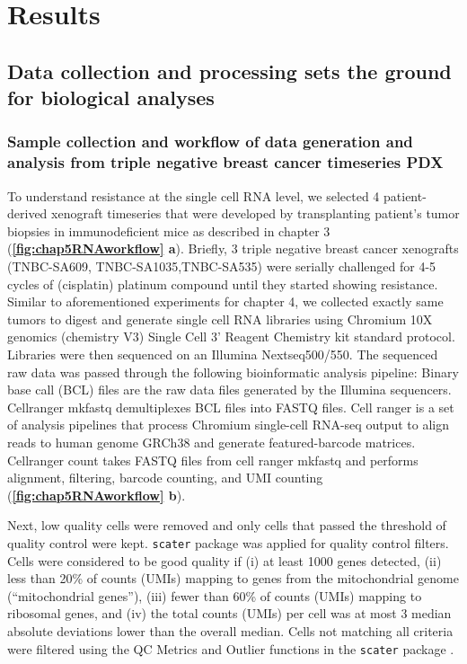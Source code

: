 \section{Results}
 

\subsection{Data collection and processing sets the ground for biological analyses} 
  
\subsubsection{Sample collection and workflow of data generation and analysis from triple negative breast cancer timeseries PDX}
To understand resistance at the single cell RNA level, we selected 4  patient-derived xenograft timeseries that were developed by transplanting patient's tumor biopsies in immunodeficient mice as described in chapter 3 (\textbf{\autoref{fig:chap5RNAworkflow} a}). 
Briefly, 3 triple negative breast cancer xenografts (TNBC-SA609, TNBC-SA1035,TNBC-SA535) were serially challenged for 4-5 cycles of (cisplatin) platinum compound until they started showing resistance.
Similar to aforementioned experiments for chapter 4, we collected exactly same tumors to digest and generate single cell RNA libraries using Chromium 10X genomics (chemistry V3) Single Cell 3' Reagent Chemistry kit standard protocol. Libraries were then sequenced on an Illumina Nextseq500/550. The sequenced raw data was passed through the following bioinformatic analysis pipeline: 
Binary base call (BCL) files are the raw data files generated by the Illumina sequencers. Cellranger mkfastq demultiplexes BCL files into FASTQ files. Cell ranger is a set of analysis pipelines that process Chromium single-cell RNA-seq output to align reads to human genome GRCh38 and generate featured-barcode matrices. Cellranger count takes FASTQ files from cell ranger mkfastq and performs alignment, filtering, barcode counting, and UMI counting (\textbf{\autoref{fig:chap5RNAworkflow} b}). 

Next, low quality cells were removed and only cells that passed the threshold of quality control were kept. 
 \texttt{scater} package was applied for quality control filters. Cells were considered to be good quality if (i) at least 1000 genes detected, (ii) less than 20\% of counts (UMIs) mapping to genes from the mitochondrial genome (``mitochondrial genes''), (iii) fewer than 60\% of counts (UMIs) mapping to ribosomal genes, and (iv) the total counts (UMIs) per cell was at most 3 median absolute deviations lower than the overall median. Cells not matching all criteria were filtered using the \ac{QC} Metrics and Outlier functions in the \texttt{scater} package \cite{mccarthy2017scater}.

